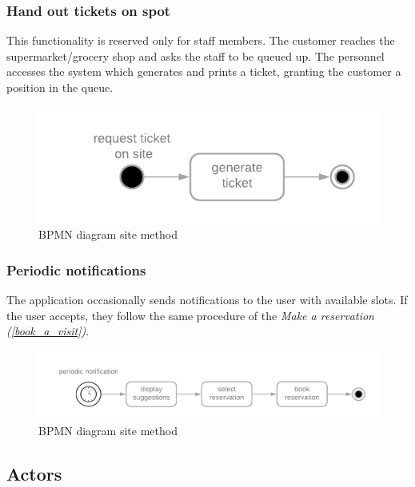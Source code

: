 \documentclass[table, 12pt]{article}
\begin{document}
\subsubsection{Hand out tickets on spot}

This functionality is reserved only for staff members. The customer reaches the supermarket/grocery shop and asks the staff to be queued up. The personnel accesses the system which generates and prints a ticket, granting the customer a position in the queue.
\begin{figure}[H]
    \begin{center}
        \includegraphics[scale=0.5]{assets/Functions/function-hand-up.png}
        \caption{BPMN diagram site method}
    \end{center}
\end{figure}

\subsubsection{Periodic notifications}
The application occasionally sends notifications to the user with available slots. If the user accepts, they follow the same procedure of the \textit{Make a reservation (\ref{book_a_visit})}.
\begin{figure}[H]
    \begin{center}
        \includegraphics[scale=0.35]{assets/Functions/function-periodic-notifications.png}
        \caption{BPMN diagram site method}
    \end{center}
\end{figure}
\subsection{Actors}
\end{document}
